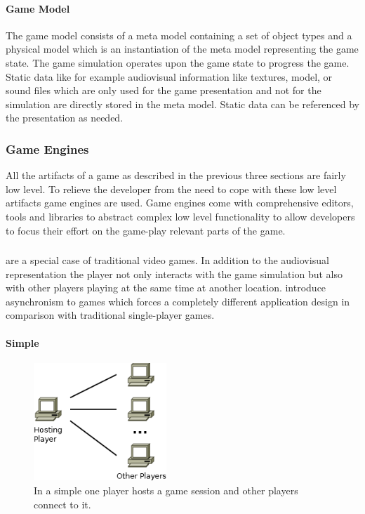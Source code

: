 \paragraph{Game Model}

The game model consists of a meta model containing a set of object types and a
physical model which is an instantiation of the meta model representing the game
state. The game simulation operates upon the game state to progress the game.
Static data like for example audiovisual information like textures, model, or
sound files which are only used for the game presentation and not for the
simulation are directly stored in the meta model. Static data can be referenced
by the presentation as needed.

\subsubsection{Game Engines}
All the artifacts of a game as described in the previous three sections are
fairly low level. To relieve the developer from the need to cope with these low
level artifacts game engines are used. Game engines come with comprehensive
editors, tools and libraries to abstract complex low level functionality to
allow developers to focus their effort on the game-play relevant parts of the
game.

\subsubsection{\ogsucuc{}}
\ogsuc{} are a special case of traditional video games. In addition to the
audiovisual representation the player not only interacts with the game
simulation but also with other players playing at the same time at another
location. \ogsuc{} introduce asynchronism to games which forces a completely
different application design in comparison with traditional single-player games.

\paragraph{Simple \ogsucuc{}}

\begin{figure}
	\centering
	\includegraphics[width=5cm]{images/SimpleOnlineGame}
	\caption{In a simple \og{} one player hosts a game session and other players
	connect to it.}
	\label{fig:simple_online_game}
\end{figure}

